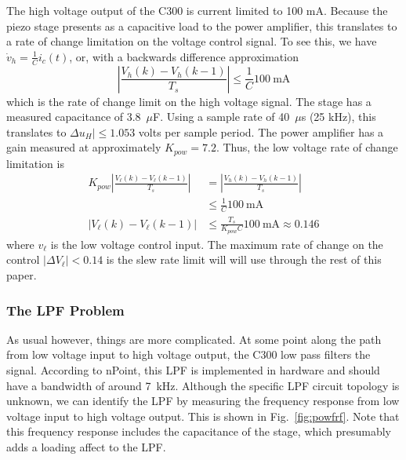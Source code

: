\documentclass[journal,12pt,twocolumn,twoside]{IEEEtran/IEEEtran}
\begin{document}
The high voltage output of the C300 is current limited to 100 mA. Because the piezo stage presents as a capacitive load to the power amplifier, this translates to a rate of change limitation on the voltage control signal. To see this, we have $\dot v_{h} = \frac{1}{C} i_c(t)$, or, with a backwards difference approximation
\begin{equation}
  |\frac{V_{h}(k) - V_{h}(k-1)}{T_s}| \leq \frac{1}{C} 100~\text{mA}
\end{equation}
which is the rate of change limit on the high voltage signal. The stage has a measured capacitance of 3.8~$\mu$F. Using a sample rate of 40~$\mu$s (25 kHz), this translates to $\Delta u_{H}|\leq 1.053$ volts per sample period. The power amplifier has a gain measured at approximately $K_{pow}=7.2$. Thus, the low voltage rate of change limitation is
\begin{align}
  K_{pow}|\frac{V_{\ell}(k) - V_{\ell}(k-1)}{T_s}|  &= |\frac{V_{h}(k) - V_{h}(k-1)}{T_s}|\\
  &\leq \frac{1}{C} 100~\text{mA}\\
|V_{\ell}(k) - V_{\ell}(k-1)|  &\leq \frac{T_s}{K_{pow}C} 100~\text{mA} \approx 0.146 \label{eqn:dvlow_max}
\end{align}
where $v_{\ell}$ is the low voltage control input. The maximum rate of change on the control $|\Delta V_{\ell}| <0.14$ is the slew rate limit will will use through the rest of this paper. 

\subsubsection{The LPF Problem}
As usual however, things are more complicated. At some point along the path from low voltage input to high voltage output, the C300 low pass filters the signal. According to nPoint, this LPF is implemented in hardware and should have a bandwidth of around 7~kHz. Although the specific LPF circuit topology is unknown, we can identify the LPF by measuring the frequency response from low voltage input to high voltage output. This is shown in Fig.~\ref{fig:powfrf}. Note that this frequency response includes the capacitance of the stage, which presumably adds a loading affect to the LPF.
\end{document}
